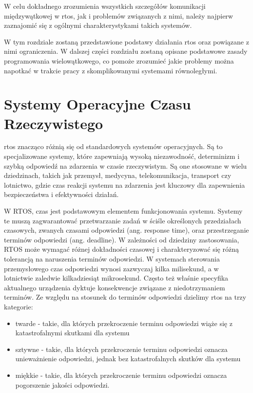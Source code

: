 W celu dokładnego zrozumienia wszystkich szczegółów komunikacji międzywątkowej w \gls{rtos},
jak i problemów związanych z nimi, należy najpierw zaznajomić się z ogólnymi
charakterystykami takich systemów.

W tym rozdziale zostaną przedstawione podstawy działania \gls{rtos}
oraz powiązane z nimi ograniczenia. W dalszej części rozdziału zostaną opisane podstawowe zasady
programowania wielowątkowego, co pomoże zrozumieć jakie problemy można napotkać w trakcie
pracy z skomplikowanymi systemami równoległymi.

\section{Systemy Operacyjne Czasu Rzeczywistego}
\Gls{rtos} znacząco różnią się od standardowych systemów operacyjnych. Są to specjalizowane systemy, które zapewniają wysoką niezawodność,
determinizm i szybką odpowiedź na zdarzenia w czasie rzeczywistym.
Są one stosowane w wielu dziedzinach, takich jak przemysł, medycyna, telekomunikacja, transport czy lotnictwo,
gdzie czas reakcji systemu na zdarzenia jest kluczowy dla zapewnienia bezpieczeństwa i efektywności działań.

W RTOS, czas jest podstawowym elementem funkcjonowania systemu. Systemy te muszą zagwarantować przetwarzanie zadań w ściśle określonych przedziałach czasowych,
zwanych czasami odpowiedzi (ang. response time), oraz przestrzeganie terminów odpowiedzi (ang. deadline).
W zależności od dziedziny zastosowania, RTOS może wymagać różnej dokładności czasowej i charakteryzować się różną tolerancją na naruszenia terminów odpowiedzi.
W systemach sterowania przemysłowego czas odpowiedzi wynosi zazwyczaj kilka milisekund, a w lotnictwie zaledwie kilkadziesiąt mikrosekund. Często też właśnie specyfika aktualnego urządzenia dyktuje konsekwencje związane z niedotrzymaniem terminów.
Ze względu na stosunek do terminów odpowiedzi dzielimy \gls{rtos} na trzy kategorie:
\begin{itemize}
      \item twarde - takie, dla których przekroczenie terminu odpowiedzi wiąże się z katastrofalnymi skutkami dla systemu
      \item sztywne - takie, dla których przekroczenie terminu odpowiedzi oznacza unieważnienie odpowiedzi, jednak bez katastrofalnych skutków dla systemu
      \item miękkie - takie, dla których przekroczenie terminu odpowiedzi oznacza pogorszenie jakości odpowiedzi.
\end{itemize}

